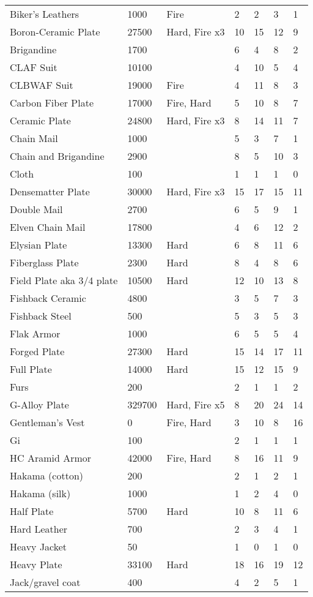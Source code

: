 \documentclass[twoside]{book}
\begin{document}
\begin{longtable}{p{1.25in}llp{2em}p{2em}p{2em}p{2em}}
      \raggedright Biker's Leathers & 1000 & Fire & 2 & 2 & 3 & 1 \tabularnewline
      \raggedright Boron-Ceramic Plate & 27500 & Hard, Fire x3 & 10 & 15 & 12 & 9 \tabularnewline
      \raggedright Brigandine & 1700 && 6 & 4 & 8 & 2 \tabularnewline
      \raggedright CLAF Suit & 10100 && 4 & 10 & 5 & 4 \tabularnewline
      \raggedright CLBWAF Suit & 19000 & Fire & 4 & 11 & 8 & 3 \tabularnewline
      \raggedright Carbon Fiber Plate & 17000 & Fire, Hard & 5 & 10 & 8 & 7 \tabularnewline
      \raggedright Ceramic Plate & 24800 & Hard, Fire x3 & 8 & 14 & 11 & 7 \tabularnewline
      \raggedright Chain Mail & 1000 && 5 & 3 & 7 & 1 \tabularnewline
      \raggedright Chain and Brigandine & 2900 && 8 & 5 & 10 & 3 \tabularnewline
      \raggedright Cloth & 100 && 1 & 1 & 1 & 0 \tabularnewline
      \raggedright Densematter Plate & 30000 & Hard, Fire x3 & 15 & 17 & 15 & 11 \tabularnewline
      \raggedright Double Mail & 2700 && 6 & 5 & 9 & 1 \tabularnewline
      \raggedright Elven Chain Mail & 17800 && 4 & 6 & 12 & 2 \tabularnewline
      \raggedright Elysian Plate & 13300 & Hard & 6 & 8 & 11 & 6 \tabularnewline
      \raggedright Fiberglass Plate & 2300 & Hard & 8 & 4 & 8 & 6 \tabularnewline
      \raggedright Field Plate aka 3/4 plate
           & 10500 & Hard & 12 & 10 & 13 & 8 \tabularnewline
      \raggedright Fishback Ceramic & 4800 && 3 & 5 & 7 & 3 \tabularnewline
      \raggedright Fishback Steel & 500 && 5 & 3 & 5 & 3 \tabularnewline
      \raggedright Flak Armor & 1000 && 6 & 5 & 5 & 4 \tabularnewline
      \raggedright Forged Plate & 27300 & Hard & 15 & 14 & 17 & 11 \tabularnewline
      \raggedright Full Plate & 14000 & Hard & 15 & 12 & 15 & 9 \tabularnewline
      \raggedright Furs & 200 && 2 & 1 & 1 & 2 \tabularnewline
      \raggedright G-Alloy Plate & 329700 & Hard, Fire x5 & 8 & 20 & 24 & 14 \tabularnewline
      \raggedright Gentleman's Vest & 0 & Fire, Hard & 3 & 10 & 8 & 16 \tabularnewline
      \raggedright Gi & 100 && 2 & 1 & 1 & 1 \tabularnewline
      \raggedright HC Aramid Armor & 42000 & Fire, Hard & 8 & 16 & 11 & 9 \tabularnewline
      \raggedright Hakama (cotton) & 200 && 2 & 1 & 2 & 1 \tabularnewline
      \raggedright Hakama (silk) & 1000 && 1 & 2 & 4 & 0 \tabularnewline
      \raggedright Half Plate & 5700 & Hard & 10 & 8 & 11 & 6 \tabularnewline
      \raggedright Hard Leather & 700 && 2 & 3 & 4 & 1 \tabularnewline
      \raggedright Heavy Jacket & 50 && 1 & 0 & 1 & 0 \tabularnewline
      \raggedright Heavy Plate & 33100 & Hard & 18 & 16 & 19 & 12 \tabularnewline
      \raggedright Jack/gravel coat & 400 && 4 & 2 & 5 & 1 \tabularnewline

\end{longtable}
\end{document}
